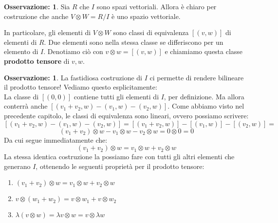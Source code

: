 \documentclass[12pt,a4paper]{report}
\theoremstyle{definition}
\theoremstyle{Theorem}
\theoremstyle{definition}
\theoremstyle{definition}
\theoremstyle{definition}
\newtheorem{Obs}[Def]{Osservazione:}
\begin{document}
	\begin{Obs}
		Sia $R$ che $I$ sono spazi vettoriali. Allora è chiaro per costruzione che anche $V\otimes W=R/I$ è uno spazio vettoriale.
	\end{Obs}
	In particolare, gli elementi di $V\otimes W$ sono classi di equivalenza $[(v,w)]$ di elementi di $R$. Due elementi sono nella stessa classe se differiscono per un elemento di $I$. Denotiamo ciò con $v\otimes w=[(v,w)]$ e chiamiamo questa classe \textbf{prodotto tensore} di $v,w$.
	\begin{Obs}
		La fastidiosa costruzione di $I$ ci permette di rendere bilineare il prodotto tensore! Vediamo questo esplicitamente:\\
		La classe di $[(0,0)]$ contiene tutti gli elementi di $I$, per definizione. Ma allora conterrà anche $[(v_1+v_2,w)-(v_1,w)-(v_2,w)]$. Come abbiamo visto nel precedente capitolo, le classi di equivalenza sono lineari, ovvero possiamo scrivere:
		$$[(v_1+v_2,w)-(v_1,w)-(v_2,w)]=[(v_1+v_2,w)]-[(v_1,w)]-[(v_2,w)]=$$
		$$(v_1+v_2)\otimes w-v_1\otimes w-v_2\otimes w=0\otimes 0=0$$
		Da cui segue immediatamente che:
		$$(v_1+v_2)\otimes w=v_1\otimes w+v_2\otimes w$$
		La stessa identica costruzione la possiamo fare con tutti gli altri elementi che generano $I$, ottenendo le seguenti proprietà per il prodotto tensore:
		\begin{enumerate}
			\item $(v_1+v_2)\otimes w=v_1\otimes w+v_2\otimes w$
			\item $v\otimes (w_1+w_2)=v\otimes w_1+v\otimes w_2$
			\item $\lambda(v\otimes w)=\lambda v\otimes w=v\otimes \lambda w$
		\end{enumerate}
	\end{Obs}
\end{document}
